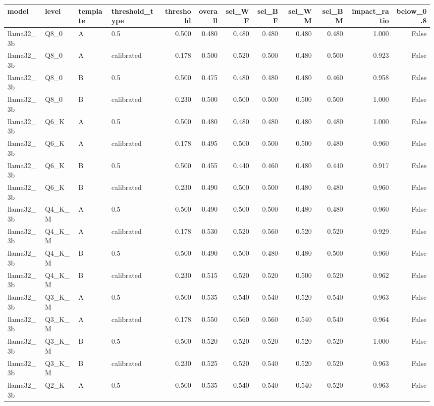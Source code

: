 \begin{tabular}{llllrrrrrrrr}
\toprule
model & level & template & threshold\_type & threshold & overall & sel\_WF & sel\_BF & sel\_WM & sel\_BM & impact\_ratio & below\_0.8 \\
\midrule
llama32\_3b & Q8\_0 & A & 0.5 & 0.500 & 0.480 & 0.480 & 0.480 & 0.480 & 0.480 & 1.000 & False \\
llama32\_3b & Q8\_0 & A & calibrated & 0.178 & 0.500 & 0.520 & 0.500 & 0.480 & 0.500 & 0.923 & False \\
llama32\_3b & Q8\_0 & B & 0.5 & 0.500 & 0.475 & 0.480 & 0.480 & 0.480 & 0.460 & 0.958 & False \\
llama32\_3b & Q8\_0 & B & calibrated & 0.230 & 0.500 & 0.500 & 0.500 & 0.500 & 0.500 & 1.000 & False \\
llama32\_3b & Q6\_K & A & 0.5 & 0.500 & 0.480 & 0.480 & 0.480 & 0.480 & 0.480 & 1.000 & False \\
llama32\_3b & Q6\_K & A & calibrated & 0.178 & 0.495 & 0.500 & 0.500 & 0.500 & 0.480 & 0.960 & False \\
llama32\_3b & Q6\_K & B & 0.5 & 0.500 & 0.455 & 0.440 & 0.460 & 0.480 & 0.440 & 0.917 & False \\
llama32\_3b & Q6\_K & B & calibrated & 0.230 & 0.490 & 0.500 & 0.500 & 0.480 & 0.480 & 0.960 & False \\
llama32\_3b & Q4\_K\_M & A & 0.5 & 0.500 & 0.490 & 0.500 & 0.500 & 0.480 & 0.480 & 0.960 & False \\
llama32\_3b & Q4\_K\_M & A & calibrated & 0.178 & 0.530 & 0.520 & 0.560 & 0.520 & 0.520 & 0.929 & False \\
llama32\_3b & Q4\_K\_M & B & 0.5 & 0.500 & 0.490 & 0.500 & 0.480 & 0.480 & 0.500 & 0.960 & False \\
llama32\_3b & Q4\_K\_M & B & calibrated & 0.230 & 0.515 & 0.520 & 0.520 & 0.500 & 0.520 & 0.962 & False \\
llama32\_3b & Q3\_K\_M & A & 0.5 & 0.500 & 0.535 & 0.540 & 0.540 & 0.520 & 0.540 & 0.963 & False \\
llama32\_3b & Q3\_K\_M & A & calibrated & 0.178 & 0.550 & 0.560 & 0.560 & 0.540 & 0.540 & 0.964 & False \\
llama32\_3b & Q3\_K\_M & B & 0.5 & 0.500 & 0.520 & 0.520 & 0.520 & 0.520 & 0.520 & 1.000 & False \\
llama32\_3b & Q3\_K\_M & B & calibrated & 0.230 & 0.525 & 0.520 & 0.540 & 0.520 & 0.520 & 0.963 & False \\
llama32\_3b & Q2\_K & A & 0.5 & 0.500 & 0.535 & 0.540 & 0.540 & 0.540 & 0.520 & 0.963 & False \\

\end{tabular}
